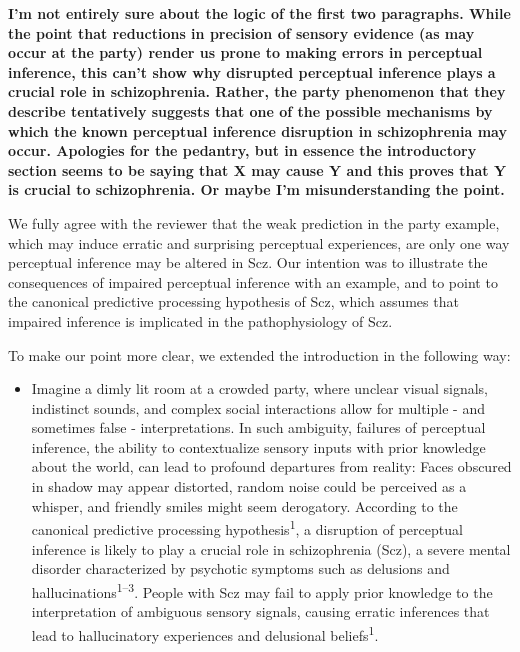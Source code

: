\documentclass[
]{article}
\providecommand{\tightlist}{%
  \setlength{\itemsep}{0pt}\setlength{\parskip}{0pt}}
\begin{document}
\textbf{I'm not entirely sure about the logic of the first two
paragraphs. While the point that reductions in precision of sensory
evidence (as may occur at the party) render us prone to making errors in
perceptual inference, this can't show why disrupted perceptual inference
plays a crucial role in schizophrenia. Rather, the party phenomenon that
they describe tentatively suggests that one of the possible mechanisms
by which the known perceptual inference disruption in schizophrenia may
occur. Apologies for the pedantry, but in essence the introductory
section seems to be saying that X may cause Y and this proves that Y is
crucial to schizophrenia. Or maybe I'm misunderstanding the point.}

We fully agree with the reviewer that the weak prediction in the party
example, which may induce erratic and surprising perceptual experiences,
are only one way perceptual inference may be altered in Scz. Our
intention was to illustrate the consequences of impaired perceptual
inference with an example, and to point to the canonical predictive
processing hypothesis of Scz, which assumes that impaired inference is
implicated in the pathophysiology of Scz.

To make our point more clear, we extended the introduction in the
following way:

\begin{itemize}
\tightlist
\item
  Imagine a dimly lit room at a crowded party, where unclear visual
  signals, indistinct sounds, and complex social interactions allow for
  multiple - and sometimes false - interpretations. In such ambiguity,
  failures of perceptual inference, the ability to contextualize sensory
  inputs with prior knowledge about the world, can lead to profound
  departures from reality: Faces obscured in shadow may appear
  distorted, random noise could be perceived as a whisper, and friendly
  smiles might seem derogatory. According to the canonical predictive
  processing hypothesis\textsuperscript{1}, a disruption of perceptual
  inference is likely to play a crucial role in schizophrenia (Scz), a
  severe mental disorder characterized by psychotic symptoms such as
  delusions and hallucinations\textsuperscript{1--3}. People with Scz
  may fail to apply prior knowledge to the interpretation of ambiguous
  sensory signals, causing erratic inferences that lead to hallucinatory
  experiences and delusional beliefs\textsuperscript{1}.
\end{itemize}
\end{document}
